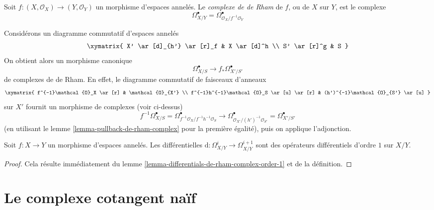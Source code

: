 \begin{definition}
\label{definition-de-rham-complex-morphism-ringed-spaces}
Soit $f : (X, \mathcal{O}_X) \to (Y, \mathcal{O}_Y)$ un morphisme
d'espaces annelés. Le {\it complexe de de Rham} de $f$, ou de $X$ sur $Y$,
est le complexe
$$
\Omega^\bullet_{X/Y} = \Omega^\bullet_{\mathcal{O}_X/f^{-1}\mathcal{O}_Y}
$$
\end{definition}

\noindent
Considérons un diagramme commutatif d'espaces annelés
$$
\xymatrix{
X' \ar[d]_{h'} \ar[r]_f & X \ar[d]^h \\
S' \ar[r]^g & S
}
$$
On obtient alors un morphisme canonique
$$
\Omega^\bullet_{X/S} \to f_*\Omega^\bullet_{X'/S'}
$$
de complexes de de Rham. En effet, le diagramme commutatif de faisceaux
d'anneaux
$$
\xymatrix{
f^{-1}\mathcal{O}_X \ar[r] & \mathcal{O}_{X'} \\
f^{-1}h^{-1}\mathcal{O}_S \ar[u] \ar[r] & (h')^{-1}\mathcal{O}_{S'} \ar[u]
}
$$
sur $X'$ fournit un morphisme de complexes (voir ci-dessus)
$$
f^{-1}\Omega^\bullet_{X/S} =
\Omega^\bullet_{f^{-1}\mathcal{O}_X/f^{-1}h^{-1}\mathcal{O}_S}
\longrightarrow
\Omega^\bullet_{\mathcal{O}_{X'}/(h')^{-1}\mathcal{O}_{S'}} =
\Omega^\bullet_{X'/S'}
$$
(en utilisant le lemme \ref{lemma-pullback-de-rham-complex} pour la première
égalité), puis on applique l'adjonction.

\begin{lemma}
\label{lemma-differentials-relative-de-rham-complex-order-1}
Soit $f : X \to Y$ un morphisme d'espaces annelés. Les différentielles
$\text{d} : \Omega^i_{X/Y}  \to \Omega^{i + 1}_{X/Y}$
sont des opérateurs différentiels d'ordre $1$ sur $X/Y$.
\end{lemma}

\begin{proof}
Cela résulte immédiatement du lemme
\ref{lemma-differentials-de-rham-complex-order-1} et de la définition.
\end{proof}





















\section{Le complexe cotangent naïf}
\label{section-netherlander}


